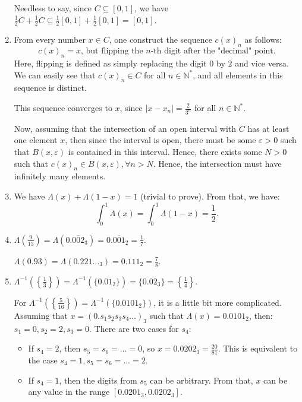 \begin{enumerate}[label=\textbf{2D.\arabic*}]
  Needless to say, since \( C \subseteq [0, 1] \), we have \( \frac{1}{2}C +
  \frac{1}{2}C \subseteq \frac{1}{2}[0, 1] + \frac{1}{2}[0, 1] = [0, 1] \).
\item 
  From every number \( x \in C \), one construct the sequence \( c(x)_{n} \) as
  follows:
  \[
    c(x)_{n} = x \text{, but flipping the } n \text{-th digit after the
      "decimal" point}
  .\] 
  Here, flipping is defined as simply replacing the digit \( 0 \) by \( 2 \) and
  vice versa. We can easily see that \( c(x)_{n} \in C \) for all \( n \in
  \mathbb{N}^{*} \), and all elements in this sequence is distinct.

  This sequence converges to \( x \), since \( |x - x_{n}| = \frac{2}{3^{n}} \)
  for all \( n \in \mathbb{N}^{*} \).

  Now, assuming that the intersection of an open interval with \( C \) has at
  least one element \( x \), then since the interval is open, there must be some
  \( \varepsilon > 0 \) such that \( B(x, \varepsilon) \) is contained in this
  interval. Hence, there exists some \( N > 0 \) such that \( c(x)_{n} \in B(x,
  \varepsilon), \forall n > N\). Hence, the intersection must have infinitely
  many elements.
\item 
  We have \( \Lambda (x) + \Lambda(1 - x)= 1 \) (trivial to prove).
  From that, we have:
  \[
    \int_{0}^{1} \Lambda (x) = \int _{0}^{1} \Lambda (1 - x) = \frac{1}{2}
  .\] 
\item 
  \( \Lambda \left( \frac{9}{13} \right)  = \Lambda(0.\overline{002}_{3}) =
  0.\overline{001}_{2} = \frac{1}{7}\).

  \( \Lambda(0.93) = \Lambda(0.221\ldots _{3}) = 0.111_{2} = \frac{7}{8} \).
\item
  \( \Lambda^{-1} \left( \left\{ \frac{1}{3} \right\}  \right) = \Lambda^{-1}
  (\{0.\overline{01}_{2}\}  ) = \{ 0.\overline{02}_{3}\} = \left\{ \frac{1}{4}
  \right\}  \).

  For \( \Lambda^{-1} \left( \left\{ \frac{5}{16} \right\}  \right) =
  \Lambda^{-1}(\{0.0101_{2}\}  )  \), it is a little bit more complicated.
  Assuming that \( x = (0.s_{1}s_{2}s_{3}s_{4}\ldots )_{3} \) such that \(
  \Lambda(x) = 0.0101_{2} \), then:
\( s_{1} = 0, s_{2} = 2, s_{3} = 0 \). There are two cases for \( s_{4} \):
\begin{itemize}
\item If \( s_{4} = 2 \), then \( s_{5}=s_{6}=\ldots =0 \), so \( x = 0.0202_{3}
  = \frac{20}{81}\). This is equivalent to the case \( s_{4} = 1, s_{5}
  = s_{6} = \ldots  = 2\).
\item If \( s_{4} = 1 \), then the digits from \( s_{5} \) can be arbitrary.
  From that, \( x \) can be any value in the range \( [0.0201_{3}, 0.0202_{3}] \).
\end{itemize}


\end{enumerate}
